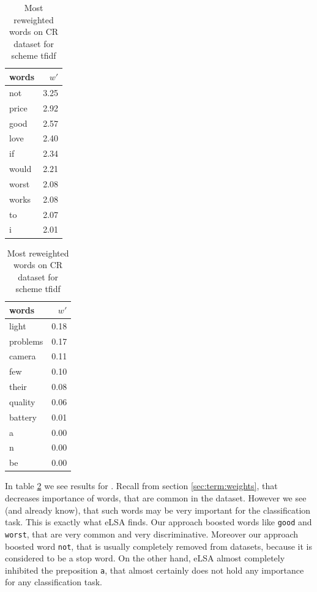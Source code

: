     
\begin{table}[h]
    \centering
    \begin{minipage}{.4\linewidth}
      \centering
        \begin{tabular}{lr}
\toprule
 words &  $w'$ \\
\midrule
   not &  3.25 \\
 price &  2.92 \\
  good &  2.57 \\
  love &  2.40 \\
    if &  2.34 \\
 would &  2.21 \\
 worst &  2.08 \\
 works &  2.08 \\
    to &  2.07 \\
     i &  2.01 \\
\bottomrule
\end{tabular}

    \end{minipage}
    \begin{minipage}{.4\linewidth}
      \centering
        \begin{tabular}{lr}
\toprule
    words &  $w'$ \\
\midrule
    light &  0.18 \\
 problems &  0.17 \\
   camera &  0.11 \\
      few &  0.10 \\
    their &  0.08 \\
  quality &  0.06 \\
  battery &  0.01 \\
        a &  0.00 \\
        n &  0.00 \\
       be &  0.00 \\
\bottomrule
\end{tabular}
    \end{minipage} 
    \caption{Most reweighted words on CR dataset for scheme tfidf}
    \label{tab:words:CR:tfidf}
\end{table}

    In table \ref{tab:words:CR:tfidf} we see results for . 
    Recall from section \ref{sec:term:weights}, that  decreases importance of words, that are common in the dataset.
    However we see (and already know), that such words may be very important for the classification task.
    This is exactly what eLSA finds. 
    Our approach boosted words like \texttt{good} and \texttt{worst}, that are very common and very discriminative.
    Moreover our approach boosted word \texttt{not}, that is usually completely removed from datasets, because it is considered to be a stop word. 
    On the other hand, eLSA almost completely inhibited the preposition \texttt{a}, that almost certainly does not hold any importance for any classification task.



